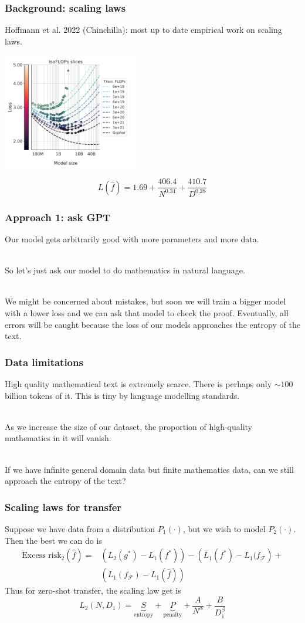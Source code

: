 \documentclass[handout]{beamer}
\begin{document}
\begin{frame}
\frametitle{Background: scaling laws}
Hoffmann et al. 2022 (Chinchilla): most up to date empirical work on scaling laws. 
\begin{center}
    \includegraphics[width=0.45\textwidth]{img/chinchilla.png} 
\end{center}
$$L(\hat{f}) = 1.69 + \frac{406.4}{N^{0.34}} + \frac{410.7}{D^{0.28}}$$
\end{frame}

\begin{frame}
\frametitle{Approach 1: ask GPT}
Our model gets arbitrarily good with more parameters and more data.\\~\

So let's just ask our model to do mathematics in natural language. \\~\

\pause
We might be concerned about mistakes, but soon we will train a bigger model with a lower loss and we can ask that model to check the proof. Eventually, all errors will be caught because the loss of our models approaches the entropy of the text.
\end{frame}

\begin{frame}
\frametitle{Data limitations}
High quality mathematical text is extremely scarce. There is perhaps only $\sim 100$ billion tokens of it. This is tiny by language modelling standards.\\~\

As we increase the size of our dataset, the proportion of high-quality mathematics in it will vanish.\\~\

If we have infinite general domain data but finite mathematics data, can we still approach the entropy of the text?
\end{frame}

\begin{frame}
\frametitle{Scaling laws for transfer}
Suppose we have data from a distribution $P_1(\cdot)$, but we wish to model $P_2(\cdot)$. Then the best we can do is 
\begin{align*}
    \text{Excess risk}_2(\hat{f}) = &\left(L_2(g^*) - L_1(f^*)\right) - \left(L_1(f^*)-L_1(f_{\mathcal{F}}\right) + \\ & \left(L_1(f_{\mathcal{F}}) - L_1(\hat{f})\right)
\end{align*}
\pause
Thus for zero-shot transfer, the scaling law get is 
$$L_2(N, D_1) = \underbrace{S}_{\text{entropy}} + \underbrace{P}_{\text{penalty}} + \frac{A}{N^\alpha} + \frac{B}{D_1^\beta}$$
\end{frame}
\end{document}
